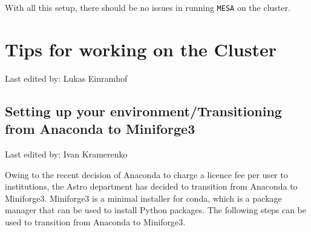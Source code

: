 \documentclass{article}
\newcommand{\setlasteditor}[1]{\gdef\lasteditor{#1}}
\newcommand{\lastedited}{%
    \vspace{1mm} {\footnotesize Last edited by: \lasteditor} \vspace{3mm}
    \newline

}
\begin{document}
With all this setup, there should be no issues in running \texttt{MESA} on the cluster.



\section{Tips for working on the Cluster}
\setlasteditor{Lukas Einramhof}
\lastedited

\subsection{Setting up your environment/Transitioning from Anaconda to Miniforge3}
\setlasteditor{Ivan Kramerenko}
\lastedited
Owing to the recent decision of Anaconda to charge a licence fee per user to institutions, the Astro department has decided to transition from Anaconda to Miniforge3. Miniforge3 is a minimal installer for conda, which is a package manager that can be used to install Python packages. The following steps can be used to transition from Anaconda to Miniforge3.
\end{document}
